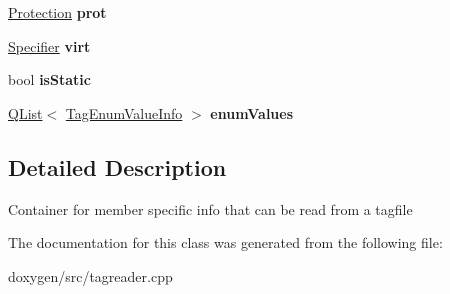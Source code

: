 \begin{DoxyCompactItemize}
\item 
\mbox{\label{class_tag_member_info_ab6705af8092ff3b4cffee19c9d4d7eca}} 
\mbox{\hyperlink{types_8h_a90e352184df58cd09455fe9996cd4ded}{Protection}} {\bfseries prot}
\item 
\mbox{\label{class_tag_member_info_a73ff13e54210faa3046174b1898ba114}} 
\mbox{\hyperlink{types_8h_ab16236bdd10ddf4d73a9847350f0017e}{Specifier}} {\bfseries virt}
\item 
\mbox{\label{class_tag_member_info_a773b80f18d20211980b63dc1defbcf6d}} 
bool {\bfseries is\+Static}
\item 
\mbox{\label{class_tag_member_info_a406e0ceb98d5141ae5f8106d6d728cf9}} 
\mbox{\hyperlink{class_q_list}{Q\+List}}$<$ \mbox{\hyperlink{class_tag_enum_value_info}{Tag\+Enum\+Value\+Info}} $>$ {\bfseries enum\+Values}
\end{DoxyCompactItemize}


\subsection{Detailed Description}
Container for member specific info that can be read from a tagfile 

The documentation for this class was generated from the following file\+:\begin{DoxyCompactItemize}
\item 
doxygen/src/tagreader.\+cpp\end{DoxyCompactItemize}
